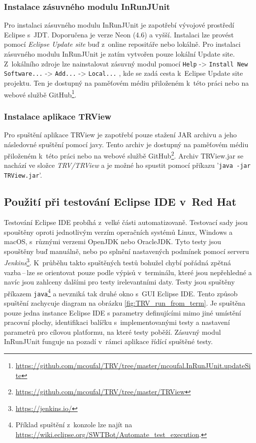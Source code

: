       \subsubsection{Instalace zásuvného modulu InRunJUnit}
      Pro instalaci zásuvného modulu InRunJUnit je zapotřebí vývojové prostředí Eclipse s~JDT. Doporučena je verze Neon (4.6) a vyšší. Instalaci lze provést pomocí \emph{Eclipse Update site} buď z~online repositáře nebo lokálně. Pro instalaci zásuvného modulu InRunJUnit je zatím vytvořen pouze lokální Update site. Z~lokálního zdroje lze nainstalovat zásuvný modul pomocí \texttt{Help} -> \texttt{Install New Software...} -> \texttt{Add...} -> \texttt{Local...} , kde se zadá cesta k~Eclipse Update site projektu. Ten je dostupný na paměťovém médiu přiloženém k~této práci nebo na webové službě GitHub\footnote{\url{https://github.com/mcoufal/TRV/tree/master/mcoufal.InRunJUnit.updateSite}}.

      \subsubsection{Instalace aplikace TRView}
      Pro spuštění aplikace TRView je zapotřebí pouze stažení JAR archivu a jeho následovné spuštění pomocí javy. Tento archiv je dostupný na paměťovém médiu přiloženém k~této práci nebo na webové službě GitHub\footnote{\url{https://github.com/mcoufal/TRV/tree/master/TRView}}. Archiv TRView.jar se nachází ve složce \emph{TRV/TRView} a je možné ho spustit pomocí příkazu '\texttt{java -jar TRView.jar}'.

    \subsection{Použití při testování Eclipse IDE v~Red Hat}
    Testování Eclipse IDE probíhá z~velké části automatizovaně. Testovací sady jsou spouštěny oproti jednotlivým verzím operačních systémů Linux, Windows a macOS, s~různými verzemi OpenJDK nebo OracleJDK. Tyto testy jsou spouštěny buď manuálně, nebo po splnění nastavených podmínek pomocí serveru \emph{Jenkins}\footnote{\url{https://jenkins.io/}}. K~průběhu takto spuštěných testů bohužel chybí pořádná zpětná vazba\,--\,lze se orientovat pouze podle výpisů v~terminálu, které jsou nepřehledné a navíc jsou zahlceny dalšími pro testy irelevantními daty. Testy jsou spuštěny příkazem \texttt{java}\footnote{Příklad spuštění z~konzole lze najít na \url{https://wiki.eclipse.org/SWTBot/Automate_test_execution}.} a nevzniká tak druhé okno s~GUI Eclipse IDE. Tento způsob spuštění zachycuje diagram na obrázku \ref{fig:TRV_run_from_term}. Je spuštěna pouze jedna instance Eclipse IDE s parametry definujícími mimo jiné umístění pracovní plochy, identifikaci balíčku s~implementovanými testy a nastavení parametrů pro cílovou platformu, na které testy poběží. Zásuvný modul InRunJUnit funguje na pozadí v~rámci aplikace řídící spuštěné testy.

